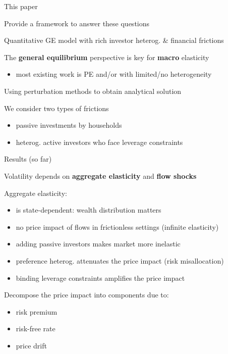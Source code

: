\documentclass[12pt,aspectratio=169]{beamer}
\newenvironment{wideitemize}{\itemize\addtolength{\itemsep}{10pt}}{\enditemize}
\begin{document}
\begin{frame}{This paper}
    \begin{wideitemize}
        \item Provide a framework to answer these questions
        \item Quantitative GE model with rich investor heterog. \& financial frictions
        \item The \textbf{general equilibrium} perspective is key for \textbf{macro} elasticity
        \begin{itemize}
            \item most existing work is PE and/or with limited/no heterogeneity
        \end{itemize}
        \item Using perturbation methods to obtain analytical solution
        \item We consider two types of frictions
        \begin{itemize}
            \item passive investments by households
            \item heterog. active investors who face leverage constraints
        \end{itemize}
    \end{wideitemize}
\end{frame}

\begin{frame}{Results (so far)}
   \begin{wideitemize}
       \item Volatility depends on \textbf{aggregate elasticity} and \textbf{flow shocks}
       \item Aggregate elasticity:
       \begin{itemize}
           \item is state-dependent: wealth distribution matters
           \item no price impact of flows in frictionless settings (infinite elasticity)
           \item adding passive investors makes market more inelastic
           \item preference heterog. attenuates the price impact (risk misallocation)
           \item binding leverage constraints amplifies the price impact
       \end{itemize}
       \item Decompose the price impact into components due to:
       \begin{itemize}
           \item risk premium
           \item risk-free rate
           \item price drift
       \end{itemize}
   \end{wideitemize} 
\end{frame}
\end{document}

